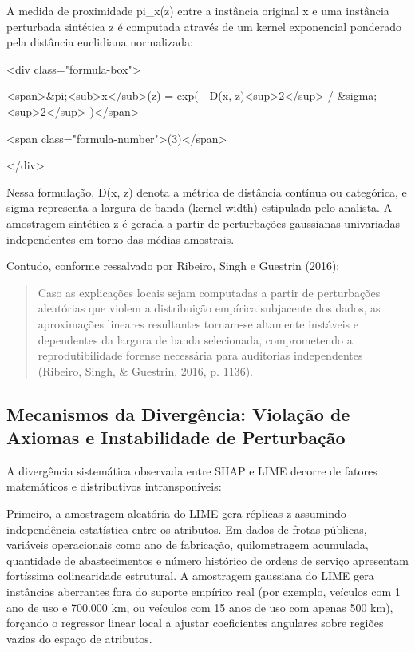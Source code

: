 \documentclass[12pt,a4paper]{article}
\begin{document}
A medida de proximidade pi\_x(z) entre a instância original x e uma instância perturbada sintética z é computada através de um kernel exponencial ponderado pela distância euclidiana normalizada:

<div class="formula-box">

<span>\&pi;<sub>x</sub>(z) = exp( - D(x, z)<sup>2</sup> / \&sigma;<sup>2</sup> )</span>

<span class="formula-number">(3)</span>

</div>

Nessa formulação, D(x, z) denota a métrica de distância contínua ou categórica, e sigma representa a largura de banda (kernel width) estipulada pelo analista. A amostragem sintética z é gerada a partir de perturbações gaussianas univariadas independentes em torno das médias amostrais.

Contudo, conforme ressalvado por Ribeiro, Singh e Guestrin (2016):

\begin{quote}
\small Caso as explicações locais sejam computadas a partir de perturbações aleatórias que violem a distribuição empírica subjacente dos dados, as aproximações lineares resultantes tornam-se altamente instáveis e dependentes da largura de banda selecionada, comprometendo a reprodutibilidade forense necessária para auditorias independentes (Ribeiro, Singh, \& Guestrin, 2016, p. 1136).
\end{quote}


\subsection{Mecanismos da Divergência: Violação de Axiomas e Instabilidade de Perturbação}

A divergência sistemática observada entre SHAP e LIME decorre de fatores matemáticos e distributivos intransponíveis:

Primeiro, a amostragem aleatória do LIME gera réplicas z assumindo independência estatística entre os atributos. Em dados de frotas públicas, variáveis operacionais como ano de fabricação, quilometragem acumulada, quantidade de abastecimentos e número histórico de ordens de serviço apresentam fortíssima colinearidade estrutural. A amostragem gaussiana do LIME gera instâncias aberrantes fora do suporte empírico real (por exemplo, veículos com 1 ano de uso e 700.000 km, ou veículos com 15 anos de uso com apenas 500 km), forçando o regressor linear local a ajustar coeficientes angulares sobre regiões vazias do espaço de atributos.
\end{document}
